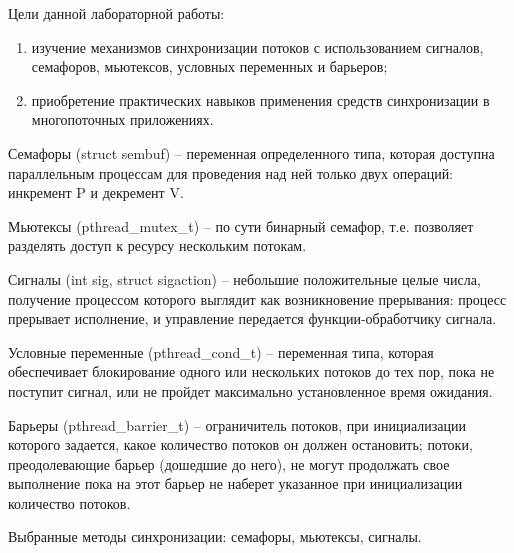 
Цели данной лабораторной работы:
\begin{enumerate}
	\item изучение механизмов синхронизации потоков с использованием сигналов, семафоров, мьютексов, условных переменных и барьеров;
	\item приобретение практических навыков применения средств синхронизации в многопоточных приложениях.
\end{enumerate}



Семафоры (struct sembuf) -- переменная определенного типа, которая доступна параллельным процессам для проведения над ней только двух операций: инкремент P и декремент V.

Мьютексы (pthread\_mutex\_t) -- по сути бинарный семафор, т.е. позволяет разделять доступ к ресурсу нескольким потокам.

Сигналы (int sig, struct sigaction) -- небольшие положительные целые числа, получение процессом которого выглядит как возникновение прерывания: процесс прерывает исполнение, и управление передается функции-обработчику сигнала. 

Условные переменные (pthread\_cond\_t) -- переменная типа, которая обеспечивает блокирование одного или нескольких потоков до тех пор, пока не поступит сигнал, или не пройдет максимально установленное время ожидания.

Барьеры (pthread\_barrier\_t) -- ограничитель потоков, при инициализации которого задается, какое количество потоков он должен остановить; потоки, преодолевающие барьер (дошедшие до него), не могут продолжать свое выполнение пока на этот барьер не наберет указанное при инициализации количество потоков.


Выбранные методы синхронизации: семафоры, мьютексы, сигналы.


%

%

%

